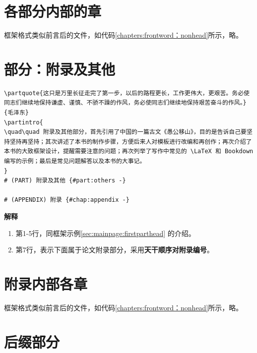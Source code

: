 \documentclass[doctor,openright,twoside]{sjtuthesis}
\newif\ifusepartquote
\newcommand{\thepartquote}{}
\newcommand{\thepartquoteauthor}{}
\newcommand{\partquote}[2]{\ifusepartquote\renewcommand{\thepartquote}{#1}\renewcommand{\thepartquoteauthor}{#2}\fi}
\newif\ifusepartintro
\newcommand{\thepartintro}{}
\newcommand{\partintro}[1]{\ifusepartintro\renewcommand{\thepartintro}{#1}\fi}
\providecommand{\tightlist}{%
    \setlength{\itemsep}{0pt}\setlength{\parskip}{0pt}}
\theoremstyle{plain}
\theoremstyle{definition}
\theoremstyle{remark}
\theoremstyle{ocrenumbox}
\theoremstyle{plain}
\begin{document}
\hypertarget{section-156}{%
\section{各部分内部的章}\label{section-156}}

框架格式类似前言后的文件，如代码\ref{chapters:frontword：nonhead}所示，略。

\hypertarget{section-157}{%
\section{部分：附录及其他}\label{section-157}}

\begin{lstlisting}[caption=附录及其他部分框架示例, label={sec:appendix:head}]
\partquote{这只是万里长征走完了第一步，以后的路程更长，工作更伟大，更艰苦。务必使同志们继续地保持谦虚、谨慎、不骄不躁的作风，务必使同志们继续地保持艰苦奋斗的作风。}{毛泽东}
\partintro{
\quad\quad 附录及其他部分，首先引用了中国的一篇古文《愚公移山》，目的是告诉自己要坚持坚持再坚持；其次讲述了本书的制作步骤，方便后来人对模板进行改编和再创作；再次介绍了本书的大致框架设计，提醒需要注意的问题；再次列举了写作中常见的 \LaTeX 和 Bookdown 编写的示例；最后是常见问题解答以及本书的大事记。
}
# (PART) 附录及其他 {#part:others -}

# (APPENDIX) 附录 {#chap:appendix -} 
\end{lstlisting}

\textbf{解释}

\begin{enumerate}
\def\labelenumi{\arabic{enumi}.}
\tightlist
\item
  第1-5行，同框架示例\ref{sec:mainpage:firstparthead} 的介绍。
\item
  第7行，表示下面属于论文附录部分，采用\textbf{天干顺序对附录编号}。
\end{enumerate}

\hypertarget{section-158}{%
\section{附录内部各章}\label{section-158}}

框架格式类似前言后的文件，如代码\ref{chapters:frontword：nonhead}所示，略。

\hypertarget{section-159}{%
\section{后缀部分}\label{section-159}}
\end{document}
